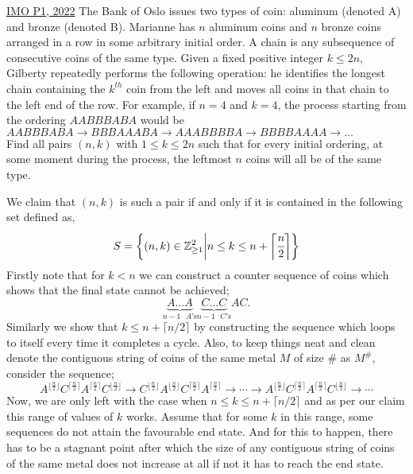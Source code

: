 \begin{problem}{3}{\href{https://artofproblemsolving.com/community/q1h2883211p34203276}{IMO P1, 2022}}
	The Bank of Oslo issues two types of coin: aluminum (denoted A) and bronze (denoted B). Marianne has $n$ aluminum coins and $n$ bronze coins arranged in a row in some arbitrary initial order. A chain is any subsequence of consecutive coins of the same type. Given a fixed positive integer $k \leq 2n$, Gilberty repeatedly performs the following operation: he identifies the longest chain containing the $k^{th}$ coin from the left and moves all coins in that chain to the left end of the row. For example, if $n=4$ and $k=4$, the process starting from the ordering $AABBBABA$ would be $AABBBABA \to BBBAAABA \to AAABBBBA \to BBBBAAAA \to ...$\\
	Find all pairs $(n,k)$ with $1 \leq k \leq 2n$ such that for every initial ordering, at some moment during the process, the leftmost $n$ coins will all be of the same type.
	\begin{solution} We claim that $(n,k)$ is such a pair if and only if it is contained in the following set defined as,
$$S=\bigg\{(n,k)\in\mathbb{Z}_{\ge 1}^2\bigg\lvert n\le k\le n+\bigg\lceil\cfrac{n}{2}\bigg\rceil\bigg\}$$Firstly note that for $k<n$ we can construct a counter sequence of coins which shows that the final state cannot be achieved;
$$\underbrace{A\ldots A}_{\text{$n-1$ $A$'s}}\underbrace{C\ldots C}_{\text{$n-1$ $C$'s}}AC.$$
	\indent Similarly we show that $k\le n+\lceil n/2\rceil$ by constructing the sequence which loops to itself every time it completes a cycle. Also, to keep things neat and clean denote the contiguous string of coins of the same metal $M$ of size $\#$ as $M^{\#}$, consider the sequence;
$$A^{\big\lfloor\frac{n}{2}\big\rfloor} C^{\big\lceil\frac{n}{2}\big\rceil} A^{\big\lceil\frac{n}{2}\big\rceil} C^{\big\lfloor\frac{n}{2}\big\rfloor}\to C^{\big\lfloor\frac{n}{2}\big\rfloor} A^{\big\lfloor\frac{n}{2}\big\rfloor} C^{\big\lceil\frac{n}{2}\big\rceil} A^{\big\lceil\frac{n}{2}\big\rceil}\to \cdots \to A^{\big\lfloor\frac{n}{2}\big\rfloor} C^{\big\lceil\frac{n}{2}\big\rceil} A^{\big\lceil\frac{n}{2}\big\rceil} C^{\big\lfloor\frac{n}{2}\big\rfloor}\to \cdots $$
	Now, we are only left with the case when $n\le k\le n+\lceil n/2\rceil$ and as per our claim this range of values of $k$ works. Assume that for some $k$ in this range, some sequences do not attain the favourable end state. And for this to happen, there has to be a stagnant point after which the size of any contiguous string of coins of the same metal does not increase at all if not it has to reach the end state.\\


\end{solution}
\end{problem}
